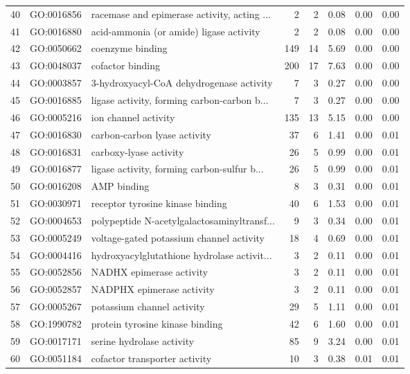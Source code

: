 \begin{table}[ht]
\begin{tabular}{rllrrrrr}
  40 & GO:0016856 & racemase and epimerase activity, acting ... &   2 &   2 & 0.08 & 0.00 & 0.00 \\ 
  41 & GO:0016880 & acid-ammonia (or amide) ligase activity &   2 &   2 & 0.08 & 0.00 & 0.00 \\ 
  42 & GO:0050662 & coenzyme binding & 149 &  14 & 5.69 & 0.00 & 0.00 \\ 
  43 & GO:0048037 & cofactor binding & 200 &  17 & 7.63 & 0.00 & 0.00 \\ 
  44 & GO:0003857 & 3-hydroxyacyl-CoA dehydrogenase activity &   7 &   3 & 0.27 & 0.00 & 0.00 \\ 
  45 & GO:0016885 & ligase activity, forming carbon-carbon b... &   7 &   3 & 0.27 & 0.00 & 0.00 \\ 
  46 & GO:0005216 & ion channel activity & 135 &  13 & 5.15 & 0.00 & 0.00 \\ 
  47 & GO:0016830 & carbon-carbon lyase activity &  37 &   6 & 1.41 & 0.00 & 0.01 \\ 
  48 & GO:0016831 & carboxy-lyase activity &  26 &   5 & 0.99 & 0.00 & 0.01 \\ 
  49 & GO:0016877 & ligase activity, forming carbon-sulfur b... &  26 &   5 & 0.99 & 0.00 & 0.01 \\ 
  50 & GO:0016208 & AMP binding &   8 &   3 & 0.31 & 0.00 & 0.01 \\ 
  51 & GO:0030971 & receptor tyrosine kinase binding &  40 &   6 & 1.53 & 0.00 & 0.01 \\ 
  52 & GO:0004653 & polypeptide N-acetylgalactosaminyltransf... &   9 &   3 & 0.34 & 0.00 & 0.01 \\ 
  53 & GO:0005249 & voltage-gated potassium channel activity &  18 &   4 & 0.69 & 0.00 & 0.01 \\ 
  54 & GO:0004416 & hydroxyacylglutathione hydrolase activit... &   3 &   2 & 0.11 & 0.00 & 0.01 \\ 
  55 & GO:0052856 & NADHX epimerase activity &   3 &   2 & 0.11 & 0.00 & 0.01 \\ 
  56 & GO:0052857 & NADPHX epimerase activity &   3 &   2 & 0.11 & 0.00 & 0.01 \\ 
  57 & GO:0005267 & potassium channel activity &  29 &   5 & 1.11 & 0.00 & 0.01 \\ 
  58 & GO:1990782 & protein tyrosine kinase binding &  42 &   6 & 1.60 & 0.00 & 0.01 \\ 
  59 & GO:0017171 & serine hydrolase activity &  85 &   9 & 3.24 & 0.00 & 0.01 \\ 
  60 & GO:0051184 & cofactor transporter activity &  10 &   3 & 0.38 & 0.01 & 0.01 \\ 

\end{tabular}
\end{table}
